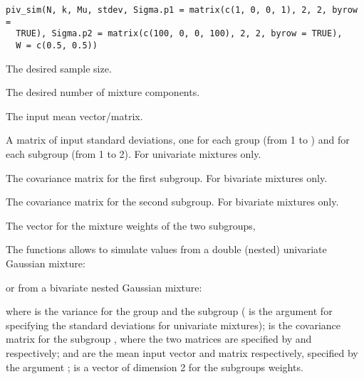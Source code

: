 \documentclass[a4paper]{book}
\begin{document}
%
\begin{Usage}
\begin{verbatim}
piv_sim(N, k, Mu, stdev, Sigma.p1 = matrix(c(1, 0, 0, 1), 2, 2, byrow =
  TRUE), Sigma.p2 = matrix(c(100, 0, 0, 100), 2, 2, byrow = TRUE),
  W = c(0.5, 0.5))
\end{verbatim}
\end{Usage}
%
\begin{Arguments}
\begin{ldescription}
\item[\code{N}] The desired sample size.

\item[\code{k}] The desired number of mixture components.

\item[\code{Mu}] The input mean vector/matrix.

\item[\code{stdev}] A  matrix of input standard deviations,
one for each group (from 1 to ) and for each subgroup (from 1 to 2).
For univariate mixtures only.

\item[\code{Sigma.p1}] The covariance matrix for the first subgroup. For bivariate mixtures only.

\item[\code{Sigma.p2}] The covariance matrix for the second subgroup. For bivariate mixtures only.

\item[\code{W}] The vector for the mixture weights of the two subgroups,
\end{ldescription}
\end{Arguments}
%
\begin{Details}\relax
The functions allows to simulate values from a double (nested) univariate
Gaussian mixture:


or from a bivariate nested Gaussian mixture:


where  is the variance for the group  and
the subgroup  ( is the
argument for specifying the  standard deviations
for univariate mixtures);
 is the covariance matrix for the
subgroup , where the two matrices are
specified by 
and  respectively;  and
are the mean input vector and matrix respectively,
specified by the argument ;
 is a vector of dimension 2 for the subgroups weights.
\end{Details}
\end{document}
